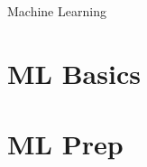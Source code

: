 



 \begin{frame}[fragile]\frametitle{}
 \begin{center}
 {\Huge Machine Learning}
 \end{center}
 \end{frame}

 \section[ML Basics]{ML Basics}





 \section[ML Prep]{ML Prep}
% 



% 
% 


